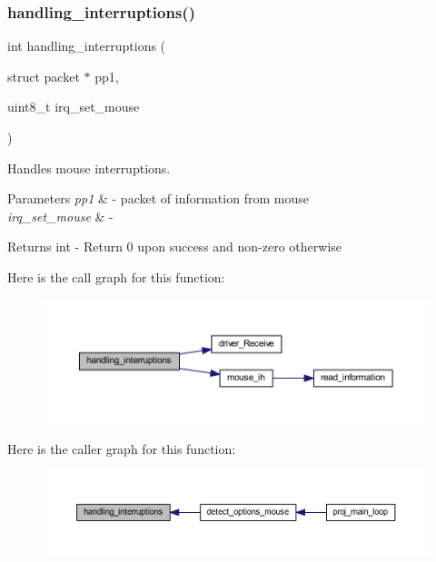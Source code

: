 \subsubsection{\texorpdfstring{handling\+\_\+interruptions()}{handling\_interruptions()}}
{\footnotesize\ttfamily int handling\+\_\+interruptions (\begin{DoxyParamCaption}\item[{struct packet $\ast$}]{pp1,  }\item[{uint8\+\_\+t}]{irq\+\_\+set\+\_\+mouse }\end{DoxyParamCaption})}



Handles mouse interruptions. 


\begin{DoxyParams}{Parameters}
{\em pp1} & -\/ packet of information from mouse \\
\hline
{\em irq\+\_\+set\+\_\+mouse} & -\/ \\
\hline
\end{DoxyParams}
\begin{DoxyReturn}{Returns}
int -\/ Return 0 upon success and non-\/zero otherwise 
\end{DoxyReturn}
Here is the call graph for this function\+:
\nopagebreak
\begin{figure}[H]
\begin{center}
\leavevmode
\includegraphics[width=350pt]{group__main__menu_gae70e892130949697cbf1d294be0adf55_cgraph}
\end{center}
\end{figure}
Here is the caller graph for this function\+:
\nopagebreak
\begin{figure}[H]
\begin{center}
\leavevmode
\includegraphics[width=350pt]{group__main__menu_gae70e892130949697cbf1d294be0adf55_icgraph}
\end{center}
\end{figure}


